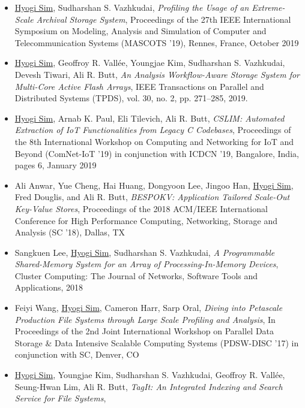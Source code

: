 \begin{itemize}
    \item \underline{Hyogi Sim}, Sudharshan S. Vazhkudai,
        {\it Profiling the Usage of an Extreme-Scale Archival Storage System},
        Proceedings of the 27th IEEE International Symposium on Modeling, Analysis and Simulation of Computer and Telecommunication Systems
        (MASCOTS '19), Rennes, France, October 2019
    \item \underline{Hyogi Sim}, Geoffroy R. Vall\'ee,
        Youngjae Kim, Sudharshan S. Vazhkudai, Devesh Tiwari, Ali R. Butt,
        {\it An Analysis Workflow-Aware Storage System for Multi-Core Active Flash Arrays},
        IEEE Transactions on Parallel and Distributed Systems (TPDS),
        vol. 30, no. 2, pp. 271–285, 2019.
    \item \underline{Hyogi Sim}, Arnab K. Paul, Eli Tilevich, Ali R. Butt,
        {\it CSLIM: Automated Extraction of IoT Functionalities from Legacy C Codebases},
        Proceedings of the 8th International Workshop on Computing and Networking for
        IoT and Beyond (ComNet-IoT ’19) in conjunction with ICDCN '19, Bangalore,
        India, pages 6, January 2019
    \item Ali Anwar, Yue Cheng, Hai Huang, Dongyoon Lee, Jingoo Han, \underline{Hyogi Sim},
        Fred Douglis, and Ali R. Butt,
        {\it BESPOKV: Application Tailored Scale-Out Key-Value Stores},
        Proceedings of the 2018 ACM/IEEE International Conference for High
        Performance Computing, Networking, Storage and Analysis (SC '18), Dallas, TX
    \item Sangkuen Lee, \underline{Hyogi Sim}, Sudharshan S. Vazhkudai,
        {\it A Programmable Shared-Memory System for an Array of Processing-In-Memory Devices},
        Cluster Computing: The Journal of Networks, Software Tools and Applications, 2018
    \item Feiyi Wang, \underline{Hyogi Sim}, Cameron Harr, Sarp Oral,
        {\it Diving into Petascale Production File Systems through
        Large Scale Profiling and Analysis},
        In Proceedings of the 2nd Joint International Workshop on Parallel Data Storage
        \& Data Intensive Scalable Computing Systems (PDSW-DISC '17)
        in conjunction with SC, Denver, CO
    \item \underline{Hyogi Sim}, Youngjae Kim, Sudharshan S. Vazhkudai,
        Geoffroy R. Vall\'ee, Seung-Hwan Lim, Ali R. Butt,
        {\it TagIt: An Integrated Indexing and Search Service for File Systems},

\end{itemize}
